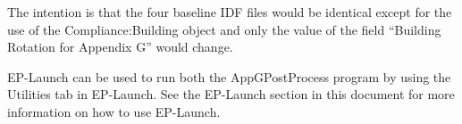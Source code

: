 The intention is that the four baseline IDF files would be identical except for the use of the Compliance:Building object and only the value of the field ``Building Rotation for Appendix G'' would change.

EP-Launch can be used to run both the AppGPostProcess program by using the Utilities tab in EP-Launch. See the EP-Launch section in this document for more information on how to use EP-Launch.
